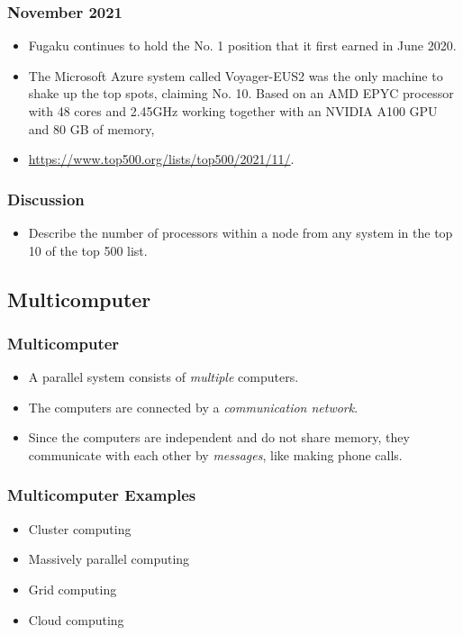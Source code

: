 \documentclass{beamer}
\begin{document}
\begin{CJK}{UTF8}{bsmi}
  \begin{frame}
    \frametitle{November 2021}
    \begin{itemize}
    \item Fugaku continues to hold the No. 1 position that it first
      earned in June 2020.
    \item The Microsoft Azure system called Voyager-EUS2 was the only
      machine to shake up the top spots, claiming No. 10. Based on an
      AMD EPYC processor with 48 cores and 2.45GHz working together with
      an NVIDIA A100 GPU and 80 GB of memory,
    \item \url{https://www.top500.org/lists/top500/2021/11/}.
    \end{itemize}
  \end{frame}

  \begin{frame}
    \frametitle{Discussion} 
    \begin{itemize}
    \item Describe the number of processors within a node from any system
      in the top 10 of the top 500 list.
    \end{itemize}
  \end{frame}


  \subsection{Multicomputer}

  \begin{frame}
    \frametitle{Multicomputer} 
    \begin{itemize}
    \item A parallel system consists of {\em multiple} computers.
    \item The computers are connected by a {\em communication network}.
    \item Since the computers are independent and do not share memory,
      they communicate with each other by {\em messages}, like making
      phone calls.
    \end{itemize}
  \end{frame}

  \begin{frame}
    \frametitle{Multicomputer Examples} 
    \begin{itemize}
    \item Cluster computing
    \item Massively parallel computing
    \item Grid computing
    \item Cloud computing
    \end{itemize}
  \end{frame}




\end{CJK}
\end{document}
